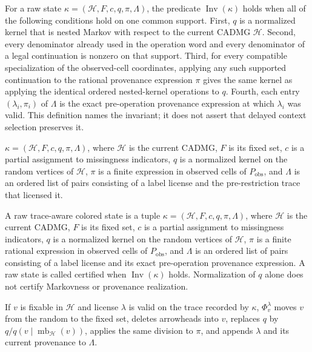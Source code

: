 For a raw state \(\kappa=(\mathcal H,F,c,q,\pi,\Lambda)\), the predicate \(\operatorname{Inv}(\kappa)\) holds when all of the following conditions hold on one common support. First, \(q\) is a normalized kernel that is nested Markov with respect to the current CADMG \(\mathcal H\). Second, every denominator already used in the operation word and every denominator of a legal continuation is nonzero on that support. Third, for every compatible specialization of the observed-cell coordinates, applying any such supported continuation to the rational provenance expression \(\pi\) gives the same kernel as applying the identical ordered nested-kernel operations to \(q\). Fourth, each entry \((\lambda_i,\pi_i)\) of \(\Lambda\) is the exact pre-operation provenance expression at which \(\lambda_i\) was valid. This definition names the invariant; it does not assert that delayed context selection preserves it.

\(\kappa=(\mathcal H,F,c,q,\pi,\Lambda)\), where \(\mathcal H\) is the current CADMG, \(F\) is its fixed set, \(c\) is a partial assignment to missingness indicators, \(q\) is a normalized kernel on the random vertices of \(\mathcal H\), \(\pi\) is a finite expression in observed cells of \(P_{\mathrm{obs}}\), and \(\Lambda\) is an ordered list of pairs consisting of a label license and the pre-restriction trace that licensed it.

A raw trace-aware colored state is a tuple \(\kappa=(\mathcal H,F,c,q,\pi,\Lambda)\), where \(\mathcal H\) is the current CADMG, \(F\) is its fixed set, \(c\) is a partial assignment to missingness indicators, \(q\) is a normalized kernel on the random vertices of \(\mathcal H\), \(\pi\) is a finite rational expression in observed cells of \(P_{\mathrm{obs}}\), and \(\Lambda\) is an ordered list of pairs consisting of a label license and its exact pre-operation provenance expression. A raw state is called certified when \(\operatorname{Inv}(\kappa)\) holds. Normalization of \(q\) alone does not certify Markovness or provenance realization.

If \(v\) is fixable in \(\mathcal H\) and license \(\lambda\) is valid on the trace recorded by \(\kappa\), \(\Phi_v^{\lambda}\) moves \(v\) from the random to the fixed set, deletes arrowheads into \(v\), replaces \(q\) by \(q/q(v\mid\operatorname{mb}_{\mathcal H}(v))\), applies the same division to \(\pi\), and appends \(\lambda\) and its current provenance to \(\Lambda\).

